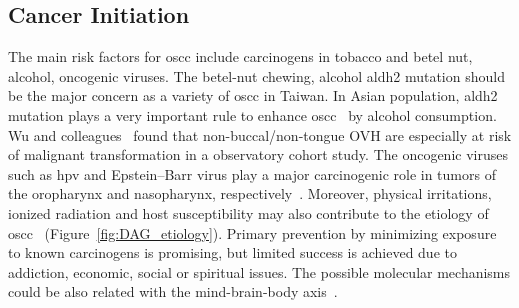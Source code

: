 \documentclass[12pt, a4paper]{article}
\begin{document}





\subsection{Cancer Initiation}
The main risk factors for \acrshort{oscc} include carcinogens in tobacco and betel nut, alcohol, oncogenic viruses.
The betel-nut chewing, alcohol \acrfull{aldh2} mutation should be the major concern as a variety of \acrshort{oscc} in Taiwan.
In Asian population, \acrfull{aldh2} mutation plays a very important rule to enhance \acrshort{oscc}~\citep{Chien2019} by alcohol consumption.
Wu and colleagues~\citep{Wu2018a} found that non-buccal/non-tongue OVH are especially at risk of malignant transformation in a observatory cohort study. 
The oncogenic viruses such as \acrfull{hpv} and Epstein–Barr virus play a major carcinogenic role in tumors of the oropharynx and nasopharynx, respectively~\citep{Ferrarotto2017}.
Moreover, physical irritations, ionized radiation and host susceptibility may also contribute to the etiology of \acrshort{oscc}~\citep{Ko1995,Znaori2003} (Figure~\ref{fig:DAG_etiology}).
Primary prevention by minimizing exposure to known carcinogens is promising, but limited success is achieved due to addiction, economic, social or spiritual issues.
The possible molecular mechanisms could be also related with the mind-brain-body axis~\citep{Berens2017}.
\end{document}
